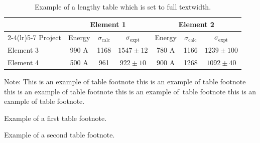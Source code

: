 \begin{table}[!ht]
\caption{Example of a lengthy table which is set to full textwidth.\label{tab2}}
\tabcolsep=0pt
\begin{threeparttable}
\begin{tabular*}{\textwidth}{@{\extracolsep{\fill}}lcccccc@{\extracolsep{\fill}}}
\toprule
& \multicolumn{3}{c}{Element 1\tnote{1}} & \multicolumn{3}{c}{Element 2\tnote{2}} \\
\cmidrule(lr){2-4}\cmidrule(lr){5-7}
Project & Energy & $\sigma_{\mathrm{calc}}$ & $\sigma_{\mathrm{expt}}$ & Energy & $\sigma_{\mathrm{calc}}$ & $\sigma_{\mathrm{expt}}$ \\
\midrule
Element 3 & 990 A & 1168 & $1547\pm12$ & 780 A & 1166 & $1239\pm100$ \\
Element 4 & 500 A & 961 & $922\pm10$ & 900 A & 1268 & $1092\pm40$ \\
\bottomrule
\end{tabular*}
\begin{tablenotes}
\item Note: This is an example of table footnote this is an example of table footnote this is an example of table footnote this is an example of~table footnote this is an example of table footnote.
\item[1] Example of a first table footnote.
\item[2] Example of a second table footnote.
\end{tablenotes}
\end{threeparttable}
\end{table}


